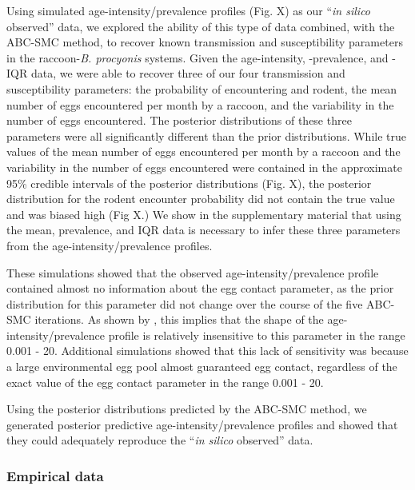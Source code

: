 \documentclass[11pt]{article}
\begin{document}
Using simulated age-intensity/prevalence profiles (Fig. X) as our ``\emph{in silico} observed'' data, we explored the ability of this type of data combined, with the ABC-SMC method, to recover known transmission and susceptibility parameters in the raccoon-\emph{B. procyonis} systems.  Given the age-intensity, -prevalence, and -IQR data, we were able to recover three of our four transmission and susceptibility parameters: the probability of encountering and rodent, the mean number of eggs encountered per month by a raccoon, and the variability in the number of eggs encountered. The posterior distributions of these three parameters were all significantly different than the prior distributions.  While true values of the mean number of eggs encountered per month by a raccoon and the variability in the number of eggs encountered were contained in the approximate 95\% credible intervals of the  posterior distributions (Fig. X), the posterior distribution for the rodent encounter probability did not contain the true value and was biased high (Fig X.)  We show in the supplementary material that using the mean, prevalence, and IQR data is necessary to infer these three parameters from the age-intensity/prevalence profiles.

These simulations showed that the observed age-intensity/prevalence profile contained almost no information about the egg contact parameter, as the prior distribution for this parameter did not change over the course of the five ABC-SMC iterations.  As shown by \cite{Toni2009}, this implies that the shape of the age-intensity/prevalence profile is relatively insensitive to this parameter in the range 0.001 - 20. Additional simulations showed that this lack of sensitivity was because a large environmental egg pool almost guaranteed egg contact, regardless of the exact value of the egg contact parameter in the range 0.001 - 20.

Using the posterior distributions predicted by the ABC-SMC method, we generated posterior predictive age-intensity/prevalence profiles and showed that they could adequately reproduce the ``\emph{in silico} observed'' data.  

\subsubsection{Empirical data}
\end{document}
